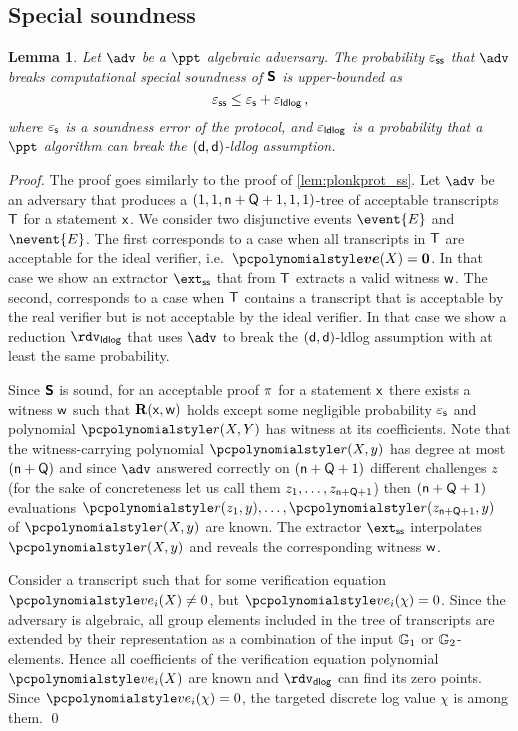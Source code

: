 \let\accentvec\vec \documentclass[runningheads,10pt]{llncs}
\def\vec#1{\mathchoice{\mbox{\boldmath$\displaystyle#1$}}
{\mbox{\boldmath$\textstyle#1$}} {\mbox{\boldmath$\scriptstyle#1$}}
{\mbox{\boldmath$\scriptscriptstyle#1$}}}
\newtheorem{lemma}[theorem]{Lemma}
\begin{document}
\subsection{Special soundness}
\begin{lemma}
		\label{lem:sonicprot_ss}
		Let $\adv$ be a $\ppt$ algebraic adversary. The probability $\varepsilon_{\mathsf{ss}}$ that
		$\adv$ breaks computational special soundness of $\bm{\mathsf{S}}$ is upper-bounded as
		\[
				\varepsilon_{\mathsf{ss}} \leq \varepsilon_{\mathsf{s}} + \varepsilon_{\mathsf{ldlog}}\,,
		\]
		where $\varepsilon_{\mathsf{s}}$ is a soundness error of the protocol, and $\varepsilon_{\mathsf{ldlog}}$ is a probability that a $\ppt$ algorithm can break the
		$(\mathsf{d}, \mathsf{d})$-ldlog assumption.
\end{lemma}
\begin{proof}
		The proof goes similarly to the proof of \cref{lem:plonkprot_ss}.
%
		Let $\adv$ be an adversary that produces a $(1, 1, \mathsf{n} + \mathsf{Q} + 1, 1, 1)$-tree of acceptable
		transcripts $\mathsf{T}$ for a statement $\mathsf{x}$. We consider two disjunctive
		events $\event{E}$ and $\nevent{E}$. The first corresponds to a case when
		all transcripts in $\mathsf{T}$ are acceptable for the ideal verifier,
		i.e.~$\vec{\vereq}(X) = \vec{0}$. In that case we show an extractor $\extss$ that
		from $\mathsf{T}$ extracts a valid witness $\mathsf{w}$. The second, corresponds to
		a case when $\mathsf{T}$ contains a transcript that is acceptable by the
		real verifier but is not acceptable by the ideal verifier. In that case we
		show a reduction $\rdvldlog$ that uses $\adv$ to break the $(\mathsf{d},
		\mathsf{d})$-ldlog
		assumption with at least the same probability.

		Since $\bm{\mathsf{S}}$ is sound, for an acceptable proof
		$\pi$ for a statement $\mathsf{x}$ there exists a witness $\mathsf{w}$ such that
		$\mathbf{R}(\mathsf{x}, \mathsf{w})$ holds except some negligible probability $\varepsilon_{\mathsf{s}}$ and polynomial $\p{r}(X, Y)$ has witness at its coefficients.
		Note that the 
		witness-carrying polynomial $\p{r}(X, y)$ has degree at most $(\mathsf{n}
		+ \mathsf{Q})$ and since $\adv$ answered correctly on $(\mathsf{n} +
		\mathsf{Q} + 1)$ different challenges $z$ (for the sake of concreteness
		let us call them $z_1, \ldots, z_{\mathsf{n} + \mathsf{Q} + 1}$) then $(\mathsf{n} +
		\mathsf{Q} + 1)$ evaluations $\p{r}(z_1, y), \ldots, \p{r}(z_{\multconstr +
		\linconstr + 1}, y)$ of $\p{r}(X, y)$ are
		known. The extractor $\extss$ interpolates $\p{r}(X, y)$ and reveals the
		corresponding witness $\mathsf{w}$.

		 Consider a transcript such that for some verification equation
		$\vereq_i(X) \neq 0$, but $\vereq_i(\chi) = 0$.
		Since the adversary is algebraic, all group elements included in the tree of
  	transcripts are extended by their representation as a combination of the input
  	$\mathbb{G}_1$ or $\mathbb{G}_2$-elements. Hence all coefficients of the verification equation polynomial
  	$\vereq_i(X)$ are known and $\rdvdlog$ can find its zero points. Since
  	$\vereq_i(\chi) = 0$, the targeted discrete log value $\chi$ is among them.
		\qed		
\end{proof}
\end{document}

